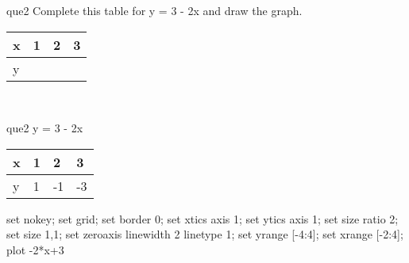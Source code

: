 \documentclass[13.5pt, varwidth=true]{beamer}
\begin{document}
\begin{frame}[shrink=19,fragile]
	\begin{beamercolorbox}[rounded=true, left, shadow=true,wd=14.8cm]{que2}
		 Complete this table for y = 3 - 2x and draw the graph. \\[0.3cm] \renewcommand{\arraystretch}{1.2}\begin{tabular}{|C|C|C|C|} \hline x & 1 & 2 & 3 \\ \hline y & & & \\ \hline \end{tabular}\\[0.3cm]
	\end{beamercolorbox}
\end{frame}
\begin{frame}[shrink=19,fragile]
	\begin{beamercolorbox}[rounded=true, left, shadow=true,wd=14.8cm]{que2}
		y = 3 - 2x\renewcommand{\arraystretch}{1.2}\begin{tabular}{|C|C|C|C|} \hline x & 1 & 2 & 3 \\ \hline y & 1 & -1 & -3\\ \hline \end{tabular}\begin{gnuplot}[terminal=pdf] set nokey; set grid; set border 0; set xtics axis 1; set ytics axis 1; set size ratio 2; set size 1,1; set zeroaxis linewidth 2 linetype 1; set yrange [-4:4]; set xrange [-2:4]; plot -2*x+3 \end{gnuplot}
	\end{beamercolorbox}
\end{frame}
\end{document}
